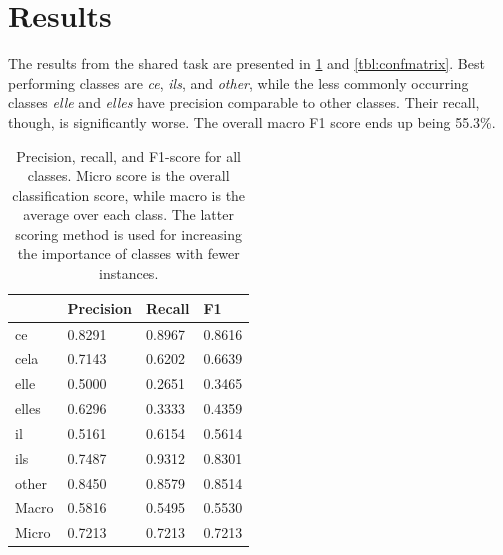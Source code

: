 \documentclass[11pt]{article}
\begin{document}
\section{Results}

The results from the shared task are presented in \cref{tbl:resultscores} and \cref{tbl:confmatrix}.
Best performing classes are \emph{ce}, \emph{ils}, and \emph{other}, while the less commonly occurring classes \emph{elle} and \emph{elles} have precision comparable to other classes.
Their recall, though, is significantly worse. The overall macro F1 score ends up being 55.3\%.

\begin{table}[t]
\centering
    \begin{tabular}{llll}
          & Precision & Recall  & F1      \\ \midrule
    ce    & 0.8291   & 0.8967 & 0.8616 \\
    cela  & 0.7143   & 0.6202 & 0.6639 \\
    elle  & 0.5000   & 0.2651 & 0.3465 \\
    elles & 0.6296   & 0.3333 & 0.4359 \\
    il    & 0.5161   & 0.6154 & 0.5614 \\
    ils   & 0.7487   & 0.9312 & 0.8301 \\
    other & 0.8450   & 0.8579 & 0.8514 \\
    \midrule
    Macro & 0.5816 & 0.5495 & 0.5530 \\
    Micro & 0.7213 & 0.7213 & 0.7213 \\
    \hline
    \end{tabular}
    \caption{Precision, recall, and F1-score for all classes. Micro score is the overall classification score, while macro is the average over each class. The latter scoring method is used for increasing the importance of classes with fewer instances.}
    \label{tbl:resultscores}
\end{table}
\end{document}
